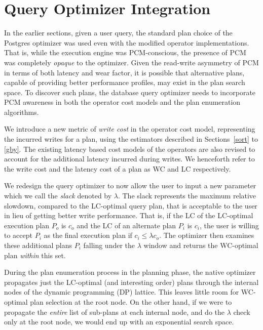 \section{Query Optimizer Integration}
\label{discussion}

In the earlier sections, given a user query, the standard plan choice
of the Postgres optimizer was used even with the modified operator
implementations. That is, while the execution engine was PCM-conscious,
the presence of PCM was completely \emph{opaque} to the optimizer.
Given the read-write asymmetry of PCM in terms of both latency and wear
factor, it is possible that alternative plans, capable of providing better
performance profiles, may exist in the plan search space. To discover
such plans, the database query optimizer needs to incorporate PCM
awareness in both the operator cost models and the plan enumeration
algorithms.

We introduce a new metric of \emph{write cost} in the operator cost model, representing the incurred writes for a plan, using the estimators described in Sections~\ref{sort} to \ref{gby}. The existing latency based cost models of the operators are also revised to account for the additional latency incurred during writes. We henceforth refer to the write cost and the latency cost of a plan as WC and LC respectively. 

We redesign the query optimizer to now allow the user to input a new parameter which we call the \emph{slack} denoted by $\lambda$. The slack represents the maximum relative slowdown, compared to the LC-optimal query plan, that is acceptable to the user in lieu of getting better write performance. That is, if the LC of the LC-optimal execution plan $P_o$ is $c_o$ and the LC of an alternate plan $P_i$ is $c_i$, the user is willing to accept $P_i$ as the final execution plan if $c_i \le \lambda c_o$. The optimizer then examines these additional plans $P_i$ falling under the $\lambda$ window and returns the WC-optimal plan \emph{within} this set.

During the plan enumeration process in the planning phase, the native optimizer propagates just the LC-optimal (and interesting order) plans through the internal nodes of the dynamic programming (DP) lattice. This leaves little room for WC-optimal plan selection at the root node. On the other hand, if we were to propagate the \emph{entire} list of sub-plans at each internal node, and do the $\lambda$ check only at the root node, we would end up with an exponential search space. 

